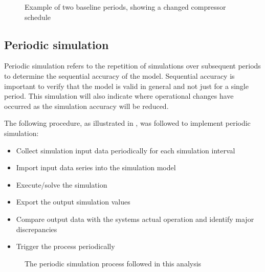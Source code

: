 		\begin{figure}[h]
			\centering
			\fbox{}
			\caption{Example of two baseline periods, showing a changed compressor schedule}
			\label{fig: Compressor schedule}
		\end{figure}
	\subsection{Periodic simulation}	
		Periodic simulation refers to the repetition of simulations over subsequent periods to determine the sequential accuracy of the model. Sequential accuracy is important to verify that the model is valid in general and not just for a single period. This simulation will also indicate where operational changes have occurred as the simulation accuracy will be reduced.
		\par 
		The following procedure, as illustrated in , was followed to implement periodic simulation: 
		\begin{itemize}
			\item Collect simulation input data periodically for each simulation interval
			\item Import input data series into the simulation model
			\item Execute/solve the simulation
			\item Export the output simulation values
			\item Compare output data with the systems actual operation and identify major discrepancies
			\item Trigger the process periodically
		\end{itemize}
	\clearpage
		\begin{figure}[h]
			\centering
			\caption{The periodic simulation process followed in this analysis}
			\label{fig: PeriodicProcess}
		\end{figure}
	

